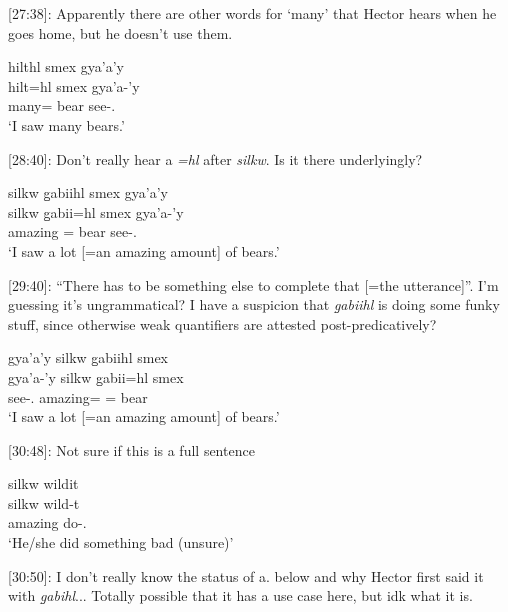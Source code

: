 [27:38]: Apparently there are other words for `many' that Hector hears when he goes home, but he doesn't use them. 

\begin{exe}
    \ex \glll hilthl smex gya'a'y \\
    hilt=hl smex gya'a-'y \\
    many=\Cn{} bear see-\Fsg{}.\Ii{}\\
    `I saw many bears.'
\end{exe}

[28:40]: Don't really hear a \textit{=hl} after \textit{silkw}. Is it there underlyingly?

\begin{exe}
    \ex \glll silkw g̱abiihl smex gya'a'y \\
    silkw g̱abii=hl smex gya'a-'y\\
    amazing \Cnt{}=\Cn{} bear see-\Fsg{}.\Ii{}\\
    `I saw a lot [=an amazing amount] of bears.'
\end{exe}

[29:40]: ``There has to be something else to complete that [=the utterance]''. I'm guessing it's ungrammatical? I have a suspicion that \textit{g̱abiihl} is doing some funky stuff, since otherwise weak quantifiers are attested post-predicatively?

\begin{exe}
    \ex \glll * gya'a'y silkw g̱abiihl smex \\
    {} gya'a-'y silkw g̱abii=hl smex\\
    {} see-\Fsg{}.\Ii{} amazing= \Cnt{}=\Cn{} bear \\
    `I saw a lot [=an amazing amount] of bears.'
\end{exe}


[30:48]: Not sure if this is a full sentence

\begin{exe}
    \ex \glll silkw wildit \\
    silkw wild-t \\
    amazing do-\Tsg{}.\Ii{} \\
    `He/she did something bad (unsure)'
\end{exe}

[30:50]: I don't really know the status of a. below and why Hector first said it with \textit{g̱abihl}... Totally possible that it has a use case here, but idk what it is.

